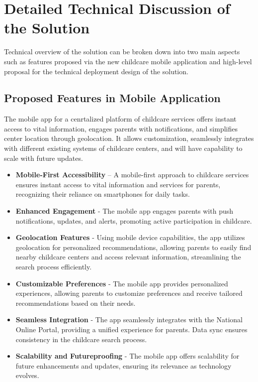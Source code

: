 \section{Detailed Technical Discussion of the Solution}

Technical overview of the solution can be broken down into two main aspects such as features proposed via the new childcare mobile application and high-level proposal for the technical deployment design of the solution.


\subsection{Proposed Features in Mobile Application}

The mobile app for a cenrtalized platform of childcare services offers instant access to vital information, engages parents with notifications, and simplifies center location through geolocation. It allows customization, seamlessly integrates with different existing systems of childcare centers, and will have capability to scale with future updates. \par

\begin{itemize}
    \item \textbf{Mobile-First Accessibility} – A mobile-first approach to childcare services ensures instant access to vital information and services for parents, recognizing their reliance on smartphones for daily tasks.
    \item \textbf{Enhanced Engagement} - The mobile app engages parents with push notifications, updates, and alerts, promoting active participation in childcare.
    \item \textbf{Geolocation Features} - Using mobile device capabilities, the app utilizes geolocation for personalized recommendations, allowing parents to easily find nearby childcare centers and access relevant information, streamlining the search process efficiently.
    \item \textbf{Customizable Preferences} - The mobile app provides personalized experiences, allowing parents to customize preferences and receive tailored recommendations based on their needs. 
    \item \textbf{Seamless Integration} - The app seamlessly integrates with the National Online Portal, providing a unified experience for parents. Data sync ensures consistency in the childcare search process.
    \item \textbf{Scalability and Futureproofing} - The mobile app offers scalability for future enhancements and updates, ensuring its relevance as technology evolves.
\end{itemize}


